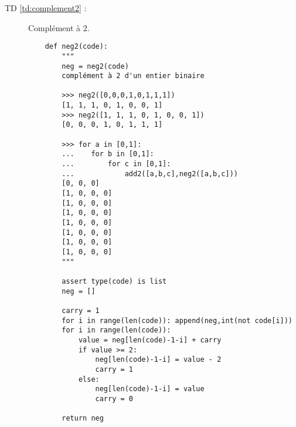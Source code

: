 \begin{minipage}[t]{10cm}
\begin{description}
\item[TD \ref{td:complement2} :] Complément à 2.

	\begin{py}{10cm}
	\begin{verbatim}
	def neg2(code):
	    """
	    neg = neg2(code)
	    complément à 2 d'un entier binaire

	    >>> neg2([0,0,0,1,0,1,1,1])
	    [1, 1, 1, 0, 1, 0, 0, 1]
	    >>> neg2([1, 1, 1, 0, 1, 0, 0, 1])
	    [0, 0, 0, 1, 0, 1, 1, 1]

	    >>> for a in [0,1]:
	    ...    for b in [0,1]:
	    ...        for c in [0,1]:
	    ...            add2([a,b,c],neg2([a,b,c]))
	    [0, 0, 0]
	    [1, 0, 0, 0]
	    [1, 0, 0, 0]
	    [1, 0, 0, 0]
	    [1, 0, 0, 0]
	    [1, 0, 0, 0]
	    [1, 0, 0, 0]
	    [1, 0, 0, 0]
	    """

	    assert type(code) is list
	    neg = []

	    carry = 1
	    for i in range(len(code)): append(neg,int(not code[i]))
	    for i in range(len(code)):
        	value = neg[len(code)-1-i] + carry
        	if value >= 2:
        	    neg[len(code)-1-i] = value - 2
        	    carry = 1
        	else:
        	    neg[len(code)-1-i] = value
        	    carry = 0

	    return neg
	\end{verbatim}
	\end{py}
\end{description}
\end{minipage}


